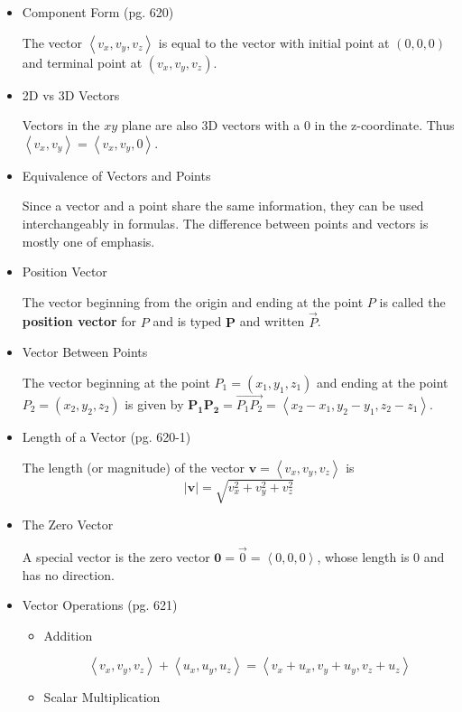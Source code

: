 \documentclass[12pt]{article}
\theoremstyle{plain}
\theoremstyle{definition}
\theoremstyle{remark}
\newcommand{\vect}[1]{\mathbf{#1}}
\begin{document}
\begin{itemize}
\begin{itemize}
	\item Component Form (pg. 620)
	
		The vector $\left<v_x,v_y,v_z\right>$ is equal to the vector with initial point at $(0,0,0)$ and terminal point at $(v_x,v_y,v_z)$.
		
	\item 2D vs 3D Vectors
	
		Vectors in the $xy$ plane are also 3D vectors with a $0$ in the z-coordinate. Thus $\left<v_x,v_y\right>=\left<v_x,v_y,0\right>$.
		
	\item Equivalence of Vectors and Points
	
		Since a vector and a point share the same information, they can be used interchangeably in formulas. The difference between points and vectors is mostly one of emphasis.
		
	\item Position Vector
	
		The vector beginning from the origin and ending at the point $P$ is called the \textbf{position vector} for $P$ and is typed $\vect{P}$ and written $\overrightarrow{P}$.
	
	\item Vector Between Points
	
	The vector beginning at the point $P_1 = (x_1,y_1,z_1)$ and ending at the point $P_2 = (x_2,y_2,z_2)$ is given by $\vect{P_1P_2} = \overrightarrow{P_1P_2} = \left<x_2-x_1,y_2-y_1,z_2-z_1\right>$.
	
	\item Length of a Vector (pg. 620-1)
	
		The length (or magnitude) of the vector $\vect{v}=\left<v_x,v_y,v_z\right>$ is \[|\vect{v}| = \sqrt{v_x^2 + v_y^2 + v_z^2}\]
	
	\item The Zero Vector
	
	A special vector is the zero vector $\vect{0} = \overrightarrow{0} = \left<0,0,0\right>$, whose length is 0 and has no direction.
	
	\item Vector Operations (pg. 621)
		\begin{itemize}
		\item Addition
		
		\[\left<v_x,v_y,v_z\right> + \left<u_x,u_y,u_z\right> = \left<v_x+u_x,v_y+u_y,v_z+u_z\right>\]
		\item Scalar Multiplication
		

\end{itemize}
\end{itemize}
\end{itemize}
\end{document}
